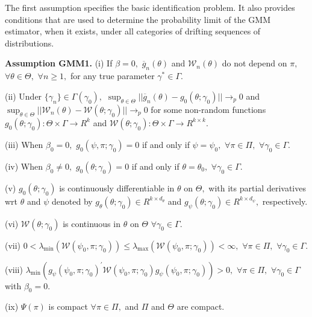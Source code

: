 \documentclass[12pt,titlepage,final,oneside,letterpaper]{article}
\begin{document}
\hspace{0.25in}The first assumption specifies the basic identification
problem. It also provides conditions that are used to determine the
probability limit of the GMM estimator, when it exists, under all categories
of drifting sequences of distributions.\medskip

\noindent \textbf{Assumption GMM1. }(i) If $\beta =0,$ $\overline{g}%
_{n}(\theta )$ and $\mathcal{W}_{n}(\theta )$ do not depend on $\pi ,$ $%
\forall \theta \in \Theta ,$ $\forall n\geq 1,$ for any true parameter $%
\gamma ^{\ast }\in \Gamma .$

\noindent (ii) Under $\{\gamma _{n}\}\in \Gamma (\gamma _{0}),$ $%
\sup_{\theta \in \Theta }||\overline{g}_{n}(\theta )-g_{0}(\theta ;\gamma
_{0})||\rightarrow _{p}0$ and $\sup_{\theta \in \Theta }||\mathcal{W}%
_{n}(\theta )-\mathcal{W}(\theta ;\gamma _{0})||\allowbreak \rightarrow
_{p}0 $ for some non-random functions $g_{0}(\theta ;\gamma _{0}):\Theta
\times \Gamma \rightarrow R^{k}$ and $\mathcal{W}(\theta ;\gamma
_{0}):\Theta \times \Gamma \rightarrow R^{k\times k}.$

\noindent (iii) When $\beta _{0}=0,$ $g_{0}(\psi ,\pi ;\gamma _{0})=0$ if
and only if $\psi =\psi _{0},$ $\forall \pi \in \Pi ,$ $\forall \gamma
_{0}\in \Gamma .$

\noindent (iv) When $\beta _{0}\neq 0,$ $g_{0}(\theta ;\gamma _{0})=0$ if
and only if $\theta =\theta _{0},$ $\forall \gamma _{0}\in \Gamma .$

\noindent (v) $g_{0}(\theta ;\gamma _{0})$ is continuously differentiable in 
$\theta $ on $\Theta ,$ with its partial derivatives wrt $\theta $ and $\psi 
$ denoted by $g_{\theta }(\theta ;\gamma _{0})\in R^{k\times d_{\theta }}$
and $g_{\psi }(\theta ;\gamma _{0})\in R^{k\times d_{\psi }},$ respectively.

\noindent (vi) $\mathcal{W}(\theta ;\gamma _{0})$ is continuous in $\theta $
on $\Theta $ $\forall \gamma _{0}\in \Gamma .$

\noindent (vii) $0<\lambda _{\min }(\mathcal{W}(\psi _{0},\pi ;\gamma
_{0}))\leq \lambda _{\max }(\mathcal{W}(\psi _{0},\pi ;\gamma _{0}))<\infty
, $ $\forall \pi \in \Pi ,$ $\forall \gamma _{0}\in \Gamma .$

\noindent (viii) $\lambda _{\min }(g_{\psi }(\psi _{0},\pi ;\gamma
_{0})^{\prime }\mathcal{W}(\psi _{0},\pi ;\gamma _{0})g_{\psi }(\psi
_{0},\pi ;\gamma _{0}))>0,$ $\forall \pi \in \Pi ,$ $\forall \gamma _{0}\in
\Gamma $ with $\beta _{0}=0.$

\noindent (ix) $\Psi (\pi )$ is compact $\forall \pi \in \Pi ,$ and $\Pi $
and $\Theta $ are compact.
\end{document}
